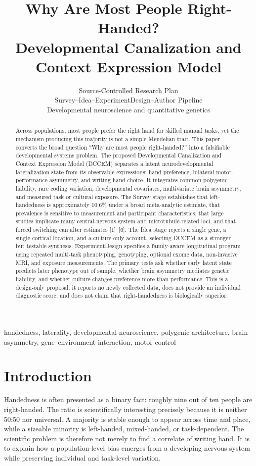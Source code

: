 \documentclass[10pt,conference]{IEEEtran}
\title{Why Are Most People Right-Handed?\\
Developmental Canalization and Context Expression Model}
\author{Source-Controlled Research Plan\\
Survey--Idea--ExperimentDesign--Author Pipeline\\
Developmental neuroscience and quantitative genetics}
\begin{document}
\maketitle

\begin{abstract}
Across populations, most people prefer the right hand for skilled manual tasks, yet the mechanism producing this majority is not a simple Mendelian trait. This paper converts the broad question ``Why are most people right-handed?'' into a falsifiable developmental systems problem. The proposed Developmental Canalization and Context Expression Model (DCCEM) separates a latent neurodevelopmental lateralization state from its observable expressions: hand preference, bilateral motor-performance asymmetry, and writing-hand choice. It integrates common polygenic liability, rare coding variation, developmental covariates, multivariate brain asymmetry, and measured task or cultural exposure. The Survey stage establishes that left-handedness is approximately 10.6\% under a broad meta-analytic estimate, that prevalence is sensitive to measurement and participant characteristics, that large studies implicate many central-nervous-system and microtubule-related loci, and that forced switching can alter estimates [1]--[6]. The Idea stage rejects a single gene, a single cortical location, and a culture-only account, selecting DCCEM as a stronger but testable synthesis. ExperimentDesign specifies a family-aware longitudinal program using repeated multi-task phenotyping, genotyping, optional exome data, non-invasive MRI, and exposure measurements. The primary tests ask whether early latent state predicts later phenotype out of sample, whether brain asymmetry mediates genetic liability, and whether culture changes preference more than performance. This is a design-only proposal: it reports no newly collected data, does not provide an individual diagnostic score, and does not claim that right-handedness is biologically superior.
\end{abstract}

\begin{IEEEkeywords}
handedness, laterality, developmental neuroscience, polygenic architecture, brain asymmetry, gene--environment interaction, motor control
\end{IEEEkeywords}

\section{Introduction}
Handedness is often presented as a binary fact: roughly nine out of ten people are right-handed. The ratio is scientifically interesting precisely because it is neither 50:50 nor universal. A majority is stable enough to appear across time and place, while a sizeable minority is left-handed, mixed-handed, or task-dependent. The scientific problem is therefore not merely to find a correlate of writing hand. It is to explain how a population-level bias emerges from a developing nervous system while preserving individual and task-level variation.
\end{document}
